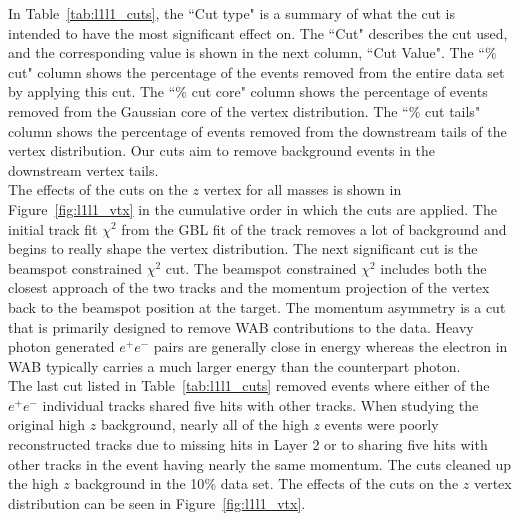 In Table~\ref{tab:l1l1_cuts}, the ``Cut type" is a summary of what the cut is intended to have the most significant effect on. The ``Cut" describes the cut used, and the corresponding value is shown in the next column, ``Cut Value". The ``$\%$ cut" column shows the percentage of the  events removed from the entire data set by applying this cut. The ``$\%$ cut core" column shows the percentage of events removed from the Gaussian core of the vertex distribution. The ``$\%$ cut tails" column shows the percentage of events removed from the downstream tails of the vertex distribution. Our cuts aim to remove background events in the downstream vertex tails.\\
\indent The effects of the cuts on the $z$ vertex for all masses is shown in Figure~\ref{fig:l1l1_vtx} in the cumulative order in which the cuts are applied. The initial track fit $\chi^{2}$ from the GBL fit of the track removes a lot of background and begins to really shape the vertex distribution. The next significant cut is the beamspot constrained $\chi^{2}$ cut. The beamspot constrained $\chi^{2}$ includes both the closest approach of the two tracks and the momentum projection of the vertex back to the beamspot position at the target. The momentum asymmetry is a cut that is primarily designed to remove WAB contributions to the data. Heavy photon generated $e^+e^-$ pairs are generally close in energy whereas the electron in WAB typically carries a much larger energy than the counterpart photon.\\ 
\indent The last cut listed in Table~\ref{tab:l1l1_cuts} removed events where either of the $e^+e^-$ individual tracks shared five hits with other tracks. When studying the original high $z$ background, nearly all of the high $z$ events were poorly reconstructed tracks due to missing hits in Layer 2 or to sharing five hits with other tracks in the event having nearly the same momentum. The cuts cleaned up the high $z$ background in the 10$\%$ data set. The effects of the cuts on the $z$ vertex distribution can be seen in Figure~\ref{fig:l1l1_vtx}.

